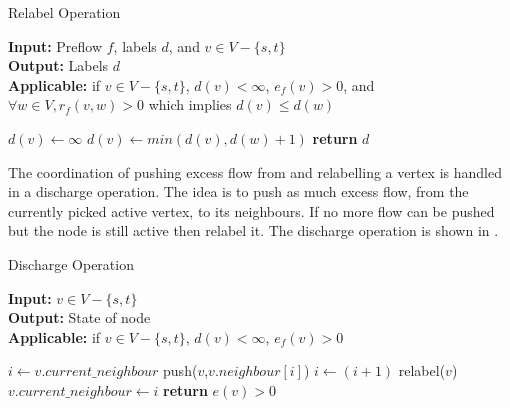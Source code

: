 \begin{algorithm}[!t]
	\caption{Relabel Operation}\label{alg:relabel}
	\textbf{Input:} Preflow $f$, labels $d$, and $v \in V-\{s,t\}$\\
	\textbf{Output:} Labels $d$\\
	\textbf{Applicable:} if $v \in V-\{s,t\}$, $d(v) < \infty$, $e_f(v)>0$, and $\forall w \in V, r_f(v,w)>0$ which implies $d(v) \leq d(w)$
	\begin{algorithmic}[1]
		\State $d(v) \gets \infty$
		\State $d(v) \gets min(d(v),d(w)+1)$
		\EndIf
		\EndFor
		\State \textbf{return} $d$
		\EndProcedure
	\end{algorithmic}
\end{algorithm}


\begin{definition}
	The coordination of pushing excess flow from and relabelling a vertex is handled in a discharge operation. The idea is to push as much excess flow, from the currently picked active vertex, to its neighbours. If no more flow can be pushed but the node is still active then relabel it. The discharge operation is shown in .
\end{definition}

\begin{algorithm}[!t]
	\caption{Discharge Operation}\label{alg:discharge}
	\textbf{Input:} $v \in V-\{s,t\}$\\
	\textbf{Output:} State of node\\
	\textbf{Applicable:} if $v \in V-\{s,t\}$, $d(v) < \infty$, $e_f(v)>0$
	\begin{algorithmic}[1]
		\State $i \gets v.current\_neighbour$
		\State push($v$,$v.neighbour[i]$)
		\State $i \gets (i+1)$
		\EndIf
		\State relabel($v$)
		\EndIf
		\State $v.current\_neighbour \gets i$
		\State \textbf{return} $e(v)>0$ 
		\EndWhile
		\EndProcedure
	\end{algorithmic}
\end{algorithm}

